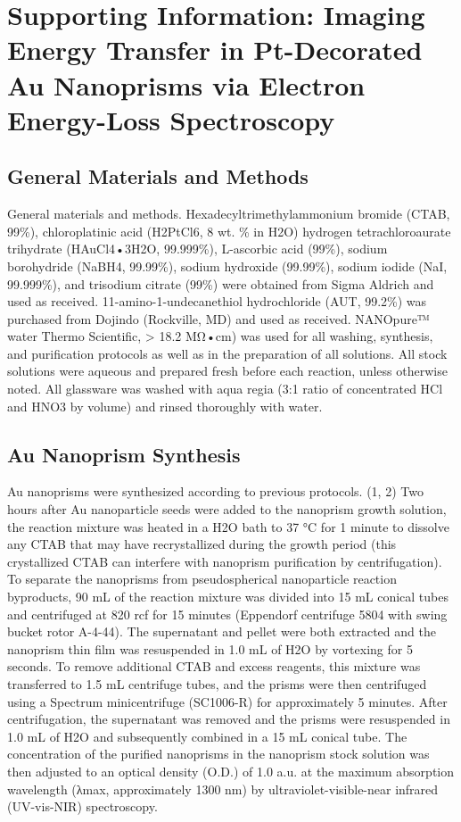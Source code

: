 \documentclass [11pt, proquest] {uwthesis}[2016/11/22]
\begin{document}
\chapter{Supporting Information: Imaging Energy Transfer in Pt-Decorated Au Nanoprisms via Electron Energy-Loss Spectroscopy}

\section{General Materials and Methods}

General materials and methods. Hexadecyltrimethylammonium bromide (CTAB, 99\%), chloroplatinic acid (H2PtCl6, 8 wt. \% in H2O) hydrogen tetrachloroaurate trihydrate (HAuCl4•3H2O, 99.999\%), L-ascorbic acid (99\%), sodium borohydride (NaBH4, 99.99\%), sodium hydroxide (99.99\%), sodium iodide (NaI, 99.999\%), and trisodium citrate (99\%) were obtained from Sigma Aldrich and used as received. 11-amino-1-undecanethiol hydrochloride (AUT, 99.2\%) was purchased from Dojindo (Rockville, MD) and used as received. NANOpure™ water Thermo Scientific, > 18.2 MΩ•cm) was used for all washing, synthesis, and purification protocols as well as in the preparation of all solutions. All stock solutions were aqueous and prepared fresh before each reaction, unless otherwise noted. All glassware was washed with aqua regia (3:1 ratio of concentrated HCl and HNO3 by volume) and rinsed thoroughly with water.

\section{Au Nanoprism Synthesis}

Au nanoprisms were synthesized according to previous protocols. (1, 2) Two hours after Au nanoparticle seeds were added to the nanoprism growth solution, the reaction mixture was heated in a H2O bath to 37 °C for 1 minute to dissolve any CTAB that may have recrystallized during the growth period (this crystallized CTAB can interfere with nanoprism purification by centrifugation). To separate the nanoprisms from pseudospherical nanoparticle reaction byproducts, 90 mL of the reaction mixture was divided into 15 mL conical tubes and
centrifuged at 820 rcf for 15 minutes (Eppendorf centrifuge 5804 with swing bucket rotor A-4-44). The supernatant and pellet were both extracted and the nanoprism thin film was resuspended in 1.0 mL of H2O by vortexing for 5 seconds. To remove additional CTAB and excess reagents, this mixture was transferred to 1.5 mL centrifuge tubes, and the prisms were then centrifuged using a Spectrum minicentrifuge (SC1006-R) for approximately 5 minutes. After centrifugation, the supernatant was removed and the prisms were resuspended in 1.0 mL of H2O and subsequently combined in a 15 mL conical tube. The concentration of the purified nanoprisms in the nanoprism stock solution was then adjusted to an optical density (O.D.) of 1.0 a.u. at the maximum absorption wavelength (λmax, approximately 1300 nm) by ultraviolet-visible-near infrared (UV-vis-NIR) spectroscopy.
\end{document}
